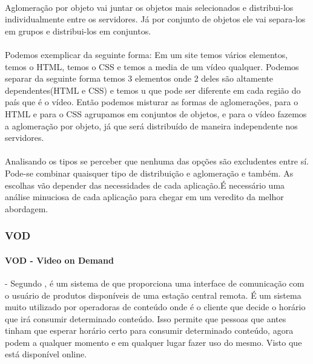 \paragraph{} Aglomera\c{c}\~ao por objeto vai juntar os objetos mais selecionados e distribui-los individualmente entre os servidores. J\'a por conjunto de objetos ele vai separa-los em grupos e distribui-los em conjuntos. 
\paragraph{} Podemos exemplicar da seguinte forma: Em um site temos v\'arios elementos, temos o HTML, temos o CSS e temos a media de um v\'ideo qualquer. Podemos separar da seguinte forma temos 3 elementos onde 2 deles s\~ao altamente dependentes(HTML e CSS) e temos u que pode ser diferente em cada regi\~ao do pa\'is que \'e o v\'ideo. Ent\~ao podemos misturar as formas de aglomera\c{c}\~oes, para o HTML e para o CSS agrupamos em conjuntos de objetos, e para o v\'ideo fazemos a aglomera\c{c}\~ao por objeto, j\'a que ser\'a distribu\'ido de maneira independente nos servidores.

\paragraph{} Analisando os tipos se perceber que nenhuma das op\c{c}\~oes s\~ao excludentes entre s\'i. Pode-se combinar quaisquer tipo de distribui\c{c}\~ao e aglomera\c{c}\~ao e tamb\'em. As escolhas v\~ao depender das necessidades de cada aplica\c{c}\~ao.\'E necess\'ario uma an\'alise minuciosa de cada aplica\c{c}\~ao para chegar em um veredito da melhor abordagem.
\subsubsection{VOD}
\label{subsec:vod}
\paragraph{VOD - Video on Demand} - Segundo \cite{garfinkle1996video}, \'e um sistema de que proporciona uma interface de comunica\c{c}\~ao com o usu\'ario de produtos dispon\'iveis de uma esta\c{c}\~ao central remota.
\newline \'E um sistema muito utilizado por operadoras de conte\'udo onde \'e o cliente que decide o hor\'ario que ir\'a consumir determinado conte\'udo.
\newline Isso permite que pessoas que antes tinham que esperar hor\'ario certo para consumir determinado conte\'udo, agora podem a qualquer momento e em qualquer lugar fazer uso do mesmo. Visto que est\'a dispon\'ivel online.
